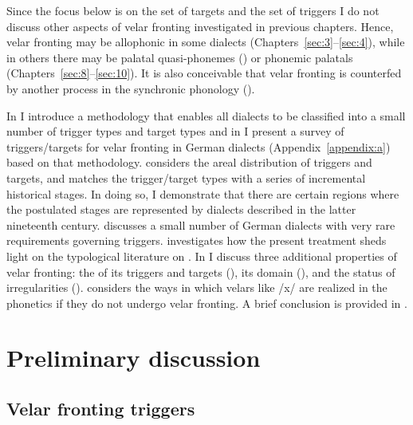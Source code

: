 Since the focus below is on the set of targets and the set of triggers I do not discuss other aspects of velar fronting investigated in previous chapters. Hence, velar fronting may be allophonic in some dialects (Chapters~\ref{sec:3}--\ref{sec:4}), while in others there may be palatal quasi-phonemes () or phonemic palatals (Chapters~\ref{sec:8}--\ref{sec:10}). It is also conceivable that velar fronting is counterfed by another process in the synchronic phonology ().

In  I introduce a methodology that enables all dialects to be classified into a small number of trigger types and target types and in  I present a survey of triggers/targets for velar fronting in German dialects (Appendix~\ref{appendix:a}) based on that methodology.  considers the areal distribution of triggers and targets, and  matches the trigger/target types with a series of incremental historical stages. In doing so, I demonstrate that there are certain regions where the postulated stages are represented by dialects described in the latter nineteenth century.  discusses a small number of German dialects with very rare requirements governing triggers.  investigates how the present treatment sheds light on the typological literature on . In  I discuss three additional properties of velar fronting: the  of its triggers and targets (), its domain (), and the status of irregularities ().  considers the ways in which velars like /x/ are realized in the phonetics if they do not undergo velar fronting. A brief conclusion is provided in .

\section{Preliminary discussion}\label{sec:12.2}

\subsection{Velar fronting triggers}\label{sec:12.2.1}

